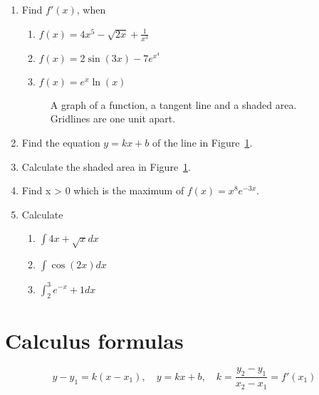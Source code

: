 \documentclass[12pt]{article}
\begin{document}
\begin{enumerate}
\item Find $f'(x)$, when
\begin{enumerate}
\item $f(x)=4x^5-\sqrt{2x}+\frac{1}{x^3}$
\item $f(x)=2\sin(3x)-7e^{x^4}$
\item $f(x)=e^x\ln(x)$
\end{enumerate}
\begin{figure}[h!]
    \centering
\def\px{1}
\def\py{2}
\def\qx{4}
\def\qy{3}
    \caption{A graph of a function, a tangent line and a shaded area. Gridlines are one unit apart.}
    \label{fig:eksponentti-deri-int}
\end{figure}
\item Find the equation $y=kx+b$ of the line in Figure~\ref{fig:eksponentti-deri-int}.
\item Calculate the shaded area in Figure~\ref{fig:eksponentti-deri-int}.
\item  Find x > 0 which is the maximum of \(f(x)=x^8e^{-3x}\).
\item Calculate
\begin{enumerate}
\item $\int 4x+\sqrt{x}dx$
\item $\int \cos(2x)dx$
\item $\int_2^3 e^{-x}+1dx$
\end{enumerate}
\end{enumerate}

\newpage
\section*{Calculus formulas}

$$y-y_1=k(x-x_1),\quad y=kx+b,\quad k=\frac{y_2-y_1}{x_2-x_1}=f'(x_1)$$
\end{document}
